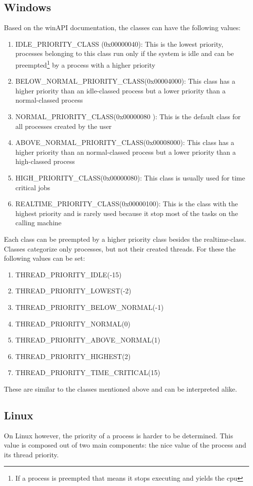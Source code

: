 \subsection{Windows}
Based on the winAPI documentation\cite{priorityClasses}, the classes can have the following values:
\begin{enumerate}
	\item IDLE\_PRIORITY\_CLASS (0x00000040): This is the lowest priority, processes belonging to this class run only if the system is idle and can be preempted\footnote{If a process is preempted that means it stops executing and yields the cpu} by a process with a higher priority
	\item BELOW\_NORMAL\_PRIORITY\_CLASS(0x00004000): This class has a higher priority than an idle-classed process but a lower priority than a normal-classed process 
	\item NORMAL\_PRIORITY\_CLASS(0x00000080
	): This is the default class for all processes created by the user
	\item ABOVE\_NORMAL\_PRIORITY\_CLASS(0x00008000): This class has a higher priority than an normal-classed process but a lower priority than a high-classed process
	\item HIGH\_PRIORITY\_CLASS(0x00000080): This class is usually used for time critical jobs
	\item REALTIME\_PRIORITY\_CLASS(0x00000100): This is the class with the highest priority and is rarely used because it stop most of the tasks on the calling machine
\end{enumerate}
Each class can be preempted by a higher priority class besides the realtime-class. Classes categorize only processes, but not their created threads. For these the following values can be set:
\begin{enumerate}
	\item THREAD\_PRIORITY\_IDLE(-15)
	\item THREAD\_PRIORITY\_LOWEST(-2)
	\item THREAD\_PRIORITY\_BELOW\_NORMAL(-1)
	\item THREAD\_PRIORITY\_NORMAL(0)
	\item THREAD\_PRIORITY\_ABOVE\_NORMAL(1)
	\item THREAD\_PRIORITY\_HIGHEST(2)
	\item THREAD\_PRIORITY\_TIME\_CRITICAL(15)
\end{enumerate}
These are similar to the classes mentioned above and can be interpreted alike.\\
\subsection{Linux}
On Linux however, the priority of a process is harder to be determined. This value is composed out of two main components: the nice value of the process and its thread priority.
